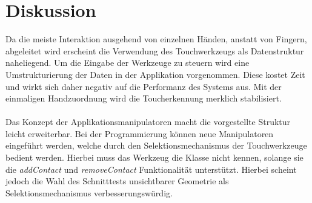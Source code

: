 \section{Diskussion}
\label{sec:diskussion_applikationsstruktur}

Da die meiste Interaktion ausgehend von einzelnen Händen, anstatt von Fingern, abgeleitet wird erscheint die Verwendung des Touchwerkzeugs als Datenstruktur naheliegend. Um die Eingabe der Werkzeuge zu steuern wird eine Umstrukturierung der Daten in der Applikation vorgenommen. Diese kostet Zeit und wirkt sich daher negativ auf die Performanz des Systems aus. Mit der einmaligen Handzuordnung wird die Toucherkennung merklich stabilisiert.
\\\\
Das Konzept der Applikationsmanipulatoren macht die vorgestellte Struktur leicht erweiterbar. Bei der Programmierung können neue Manipulatoren eingeführt werden, welche durch den Selektionsmechanismus der Touchwerkzeuge bedient werden. Hierbei muss das Werkzeug die Klasse nicht kennen, solange sie die \emph{addContact} und \emph{removeContact} Funktionalität unterstützt. Hierbei scheint jedoch die Wahl des Schnitttests unsichtbarer Geometrie als Selektionsmechanismus verbesserungswürdig.
